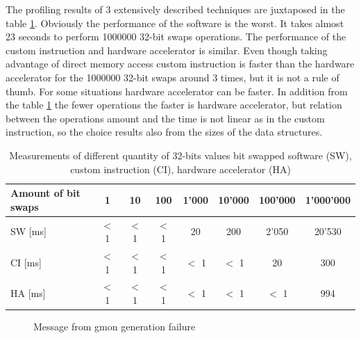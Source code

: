 The profiling results of 3 extensively described techniques are juxtaposed in the table \ref{table:prof_summary}. Obviously the performance of the software is the worst. It takes almost 23 seconds to perform 1000000 32-bit swaps operations. The performance of the custom instruction and hardware accelerator is similar. Even though taking advantage of direct memory access custom instruction is faster than the hardware accelerator for the 1000000 32-bit swaps around 3 times, but it is not a rule of thumb. For some situations hardware accelerator can be faster. In addition from the table \ref{table:prof_summary} the fewer operations the faster is hardware accelerator, but relation between the operations amount and the time is not linear as in the custom instruction, so the choice results also from the sizes of the data structures. 

\begin{table}[h!]
\centering
\begin{tabular}{    |l|c|c|c|c|c|c|c|  }
\hline
 Amount of bit swaps & 1 & 10 & 100 & 1'000 & 10'000 & 100'000 & 1'000'000 \\
 \hline
  SW [ms] & $<$ 1  & $<$ 1  & $<$ 1 & 20 & 200 & 2'050 & 20'530 \\
  CI [ms] & $<$ 1  & $<$ 1  & $<$ 1 & $<$ 1 & $<$ 1 & 20 & 300 \\
  HA [ms] & $<$ 1  & $<$ 1  & $<$ 1 & $<$ 1 & $<$ 1 & $<$ 1 & 994\\
 \hline
\end{tabular}
 \caption{Measurements of different quantity of 32-bits values bit swapped software (SW), custom instruction (CI), hardware accelerator (HA)}
\label{table:prof_summary}
\end{table}

\begin{figure}[H]
	\begin{center}
	\end{center}
	\caption{Message from gmon generation failure}

	\label{fig:gmon}
\end{figure}

